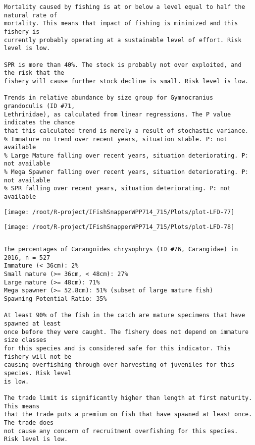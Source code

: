 \documentclass{report}\usepackage[]{graphicx}\usepackage[]{color}
\makeatletter
\def\maxwidth{ %
  \ifdim\Gin@nat@width>\linewidth
    \linewidth
  \else
    \Gin@nat@width
  \fi
}
\newenvironment{kframe}{%
 \def\at@end@of@kframe{}%
 \ifinner\ifhmode%
  \def\at@end@of@kframe{\end{minipage}}%
  \begin{minipage}{\columnwidth}%
 \fi\fi%
 \def\FrameCommand##1{\hskip\@totalleftmargin \hskip-\fboxsep
 \colorbox{shadecolor}{##1}\hskip-\fboxsep
     \hskip-\linewidth \hskip-\@totalleftmargin \hskip\columnwidth}%
 \MakeFramed {\advance\hsize-\width
   \@totalleftmargin\z@ \linewidth\hsize
   \@setminipage}}%
 {\par\unskip\endMakeFramed%
 \at@end@of@kframe}
\newenvironment{knitrout}{}{} %
\makeatother
\begin{document}
\begin{knitrout}
\begin{kframe}
\begin{verbatim}
Mortality caused by fishing is at or below a level equal to half the natural rate of
mortality. This means that impact of fishing is minimized and this fishery is
currently probably operating at a sustainable level of effort. Risk level is low.
 
SPR is more than 40%. The stock is probably not over exploited, and the risk that the
fishery will cause further stock decline is small. Risk level is low.
 
Trends in relative abundance by size group for Gymnocranius grandoculis (ID #71,
Lethrinidae), as calculated from linear regressions. The P value indicates the chance
that this calculated trend is merely a result of stochastic variance.
% Immature no trend over recent years, situation stable. P: not available
% Large Mature falling over recent years, situation deteriorating. P: not available
% Mega Spawner falling over recent years, situation deteriorating. P: not available
% SPR falling over recent years, situation deteriorating. P: not available
\end{verbatim}
\end{kframe}
\texttt{[image: /root/R-project/IFishSnapperWPP714\_715/Plots/plot-LFD-77]} 

\texttt{[image: /root/R-project/IFishSnapperWPP714\_715/Plots/plot-LFD-78]} 
\begin{kframe}\begin{verbatim}
\end{verbatim}
\end{kframe}
\clearpage
\newpage
\begin{kframe}\begin{verbatim}The percentages of Carangoides chrysophrys (ID #76, Carangidae) in 2016, n = 527
Immature (< 36cm): 2%
Small mature (>= 36cm, < 48cm): 27%
Large mature (>= 48cm): 71%
Mega spawner (>= 52.8cm): 51% (subset of large mature fish)
Spawning Potential Ratio: 35%
 
At least 90% of the fish in the catch are mature specimens that have spawned at least
once before they were caught. The fishery does not depend on immature size classes
for this species and is considered safe for this indicator. This fishery will not be
causing overfishing through over harvesting of juveniles for this species. Risk level
is low.

The trade limit is significantly higher than length at first maturity.  This means
that the trade puts a premium on fish that have spawned at least once. The trade does
not cause any concern of recruitment overfishing for this species. Risk level is low.


\end{verbatim}
\end{kframe}
\end{knitrout}
\end{document}
